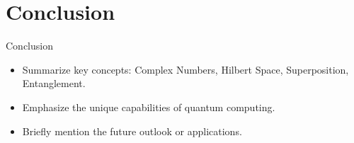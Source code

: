 \documentclass{beamer}
\begin{document}
\section{Conclusion}
\begin{frame}{Conclusion}
    \begin{itemize}
        \item Summarize key concepts: Complex Numbers, Hilbert Space, Superposition, Entanglement.
        \item Emphasize the unique capabilities of quantum computing.
        \item Briefly mention the future outlook or applications.
    \end{itemize}
\end{frame}
\end{document}
